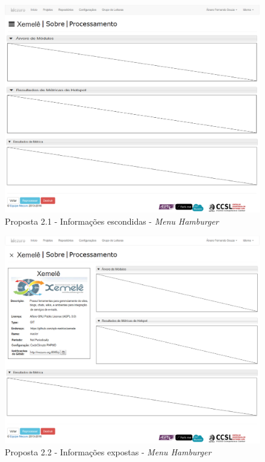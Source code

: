 \begin{figure}[!htb]
	\centering
    \includegraphics[keepaspectratio=true,scale=0.35]
    {figuras/mezuro-repositorio-view-hamburguer-close.eps}
  \caption{Proposta 2.1 - Informações escondidas - \textit{Menu Hamburger}}
  \label{fig:mezuro-repositorio-view-hamburguer-close}
\end{figure}

\begin{figure}[!htb]
	\centering
    \includegraphics[keepaspectratio=true,scale=0.35]
    {figuras/mezuro-repositorio-view-hamburguer-open.eps}
  \caption{Proposta 2.2 - Informações expostas - \textit{Menu Hamburger}}
  \label{fig:mezuro-repositorio-view-hamburguer-open}
\end{figure}

